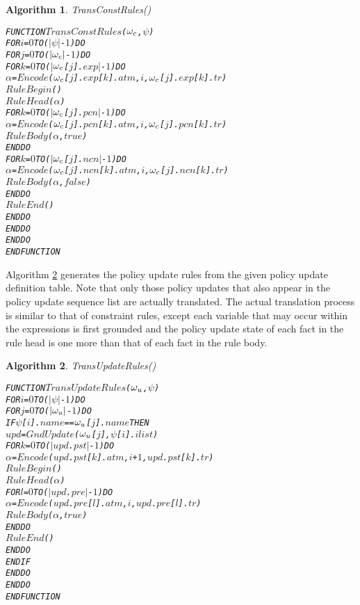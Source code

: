 \documentclass[11pt]{report}
\newenvironment{vverbatim}
{
  \begin{alltt}
}
{
    \vspace{-\baselineskip}
  \end{alltt}
}
\newtheorem{vvalgorithm}{Algorithm}[chapter]
\newenvironment{valgorithm}[2]
{
  \begin{vvalgorithm}{#1}
    \label{#2}
    \small
    \begin{vverbatim}
}
{
    \end{vverbatim}
  \end{vvalgorithm}
}
\begin{document}
          \begin{valgorithm}{TransConstRules()}{algo-polup-tconr}
FUNCTION \(TransConstRules\)(\(\omega\sb{c}\), \(\psi\))
  FOR \(i\) = \(0\) TO (\(|\psi|\) - \(1\)) DO
    FOR \(j\) = \(0\) TO (\(|\omega\sb{c}|\) - \(1\)) DO
      FOR \(k\) = \(0\) TO (\(|\)\(\omega\sb{c}\)[\(j\)].\(exp\)\(|\) - \(1\)) DO
        \(\alpha\) = \(Encode\)(\(\omega\sb{c}\)[\(j\)].\(exp\)[\(k\)].\(atm\), \(i\), \(\omega\sb{c}\)[\(j\)].\(exp\)[\(k\)].\(tr\))
        \(RuleBegin\)()
        \(RuleHead\)(\(\alpha\))
        FOR \(k\) = \(0\) TO (\(|\)\(\omega\sb{c}\)[\(j\)].\(pcn\)\(|\) - \(1\)) DO
          \(\alpha\) = \(Encode\)(\(\omega\sb{c}\)[\(j\)].\(pcn\)[\(k\)].\(atm\), \(i\), \(\omega\sb{c}\)[\(j\)].\(pcn\)[\(k\)].\(tr\))
          \(RuleBody\)(\(\alpha\), \(true\))
        ENDDO
        FOR \(k\) = \(0\) TO (\(|\)\(\omega\sb{c}\)[\(j\)].\(ncn\)\(|\) - \(1\)) DO
          \(\alpha\) = \(Encode\)(\(\omega\sb{c}\)[\(j\)].\(ncn\)[\(k\)].\(atm\), \(i\), \(\omega\sb{c}\)[\(j\)].\(ncn\)[\(k\)].\(tr\))
          \(RuleBody\)(\(\alpha\), \(false\))
        ENDDO
        \(RuleEnd\)()
      ENDDO
    ENDDO
  ENDDO
ENDFUNCTION
          \end{valgorithm}

          Algorithm \ref{algo-polup-tupdr} generates the policy update rules
          from the given policy update definition table. Note that only those
          policy updates that also appear in the policy update sequence list
          are actually translated. The actual translation process is similar
          to that of constraint rules, except each variable that may occur
          within the expressions is first grounded and the policy update state
          of each fact in the rule head is one more than that of each fact in
          the rule body.

          \begin{valgorithm}{TransUpdateRules()}{algo-polup-tupdr}
FUNCTION \(TransUpdateRules\)(\(\omega\sb{u}\), \(\psi\))
  FOR \(i\) = \(0\) TO (\(|\psi|\) - \(1\)) DO
    FOR \(j\) = \(0\) TO (\(|\omega\sb{u}|\) - \(1\)) DO
      IF \(\psi\)[\(i\)].\(name\) == \(\omega\sb{u}\)[\(j\)].\(name\) THEN
        \(upd\) = \(GndUpdate\)(\(\omega\sb{u}\)[\(j\)], \(\psi\)[\(i\)].\(ilist\))
        FOR \(k\) = \(0\) TO (\(|\)\(upd\).\(pst\)\(|\) - \(1\)) DO
          \(\alpha\) = \(Encode\)(\(upd\).\(pst\)[\(k\)].\(atm\), \(i\) + \(1\), \(upd\).\(pst\)[\(k\)].\(tr\))
          \(RuleBegin\)()
          \(RuleHead\)(\(\alpha\))
          FOR \(l\) = \(0\) TO (\(|\)\(upd\).\(pre\)\(|\) - \(1\)) DO
            \(\alpha\) = \(Encode\)(\(upd\).\(pre\)[\(l\)].\(atm\), \(i\), \(upd\).\(pre\)[\(l\)].\(tr\))
            \(RuleBody\)(\(\alpha\), \(true\))
          ENDDO
          \(RuleEnd\)()
        ENDDO
      ENDIF
    ENDDO
  ENDDO
ENDFUNCTION
          \end{valgorithm}
\end{document}
